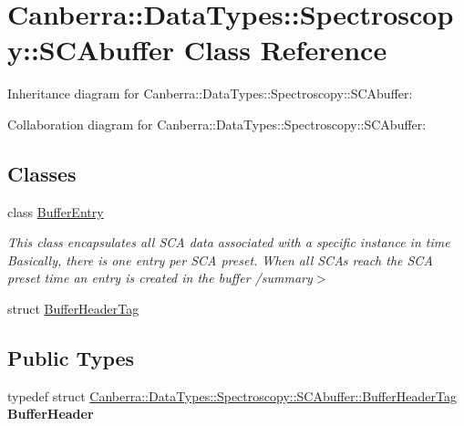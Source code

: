 \hypertarget{class_canberra_1_1_data_types_1_1_spectroscopy_1_1_s_c_abuffer}{}\section{Canberra\+:\+:Data\+Types\+:\+:Spectroscopy\+:\+:S\+C\+Abuffer Class Reference}
\label{class_canberra_1_1_data_types_1_1_spectroscopy_1_1_s_c_abuffer}


Inheritance diagram for Canberra\+:\+:Data\+Types\+:\+:Spectroscopy\+:\+:S\+C\+Abuffer\+:


Collaboration diagram for Canberra\+:\+:Data\+Types\+:\+:Spectroscopy\+:\+:S\+C\+Abuffer\+:
\subsection*{Classes}
\begin{DoxyCompactItemize}
\item 
class \hyperlink{class_canberra_1_1_data_types_1_1_spectroscopy_1_1_s_c_abuffer_1_1_buffer_entry}{Buffer\+Entry}
\begin{DoxyCompactList}\small\item\em This class encapsulates all S\+CA data associated with a specific instance in time Basically, there is one entry per S\+CA preset. When all S\+CA\textquotesingle{}s reach the S\+CA preset time an entry is created in the buffer /summary$>$ \end{DoxyCompactList}\item 
struct \hyperlink{class_canberra_1_1_data_types_1_1_spectroscopy_1_1_s_c_abuffer_df/d28/struct_canberra_1_1_data_types_1_1_spectroscopy_1_1_s_c_abuffer_1_1_buffer_header_tag}{Buffer\+Header\+Tag}
\end{DoxyCompactItemize}
\subsection*{Public Types}
\begin{DoxyCompactItemize}
\item 
\mbox{\label{class_canberra_1_1_data_types_1_1_spectroscopy_1_1_s_c_abuffer_af861efe83ce424422624f75aaf487ecb}} 
typedef struct \hyperlink{class_canberra_1_1_data_types_1_1_spectroscopy_1_1_s_c_abuffer_df/d28/struct_canberra_1_1_data_types_1_1_spectroscopy_1_1_s_c_abuffer_1_1_buffer_header_tag}{Canberra\+::\+Data\+Types\+::\+Spectroscopy\+::\+S\+C\+Abuffer\+::\+Buffer\+Header\+Tag} {\bfseries Buffer\+Header}
\end{DoxyCompactItemize}
